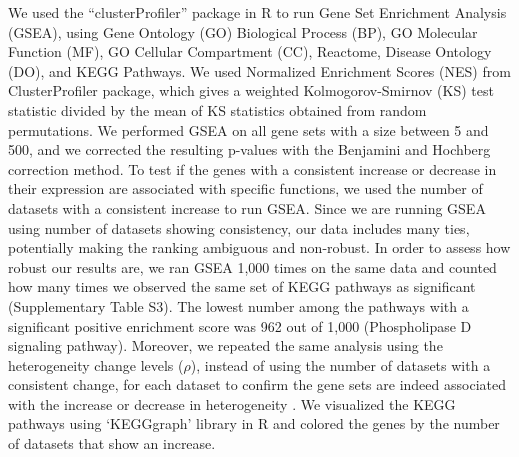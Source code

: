 \documentclass[12pt,twoside]{unicam}
\begin{document}
We used the ``clusterProfiler'' package in R to run Gene Set Enrichment Analysis (GSEA), using Gene Ontology (GO) Biological Process (BP), GO Molecular Function (MF), GO Cellular Compartment (CC), Reactome, Disease Ontology (DO), and KEGG Pathways. We used Normalized Enrichment Scores (NES) from ClusterProfiler package, which gives a weighted Kolmogorov-Smirnov (KS) test statistic divided by the mean of KS statistics obtained from random permutations. We performed GSEA on all gene sets with a size between 5 and 500, and we corrected the resulting p-values with the Benjamini and Hochberg correction method. To test if the genes with a consistent increase or decrease in their expression are associated with specific functions, we used the number of datasets with a consistent increase to run GSEA. Since we are running GSEA using number of datasets showing consistency, our data includes many ties, potentially making the ranking ambiguous and non-robust. In order to assess how robust our results are, we ran GSEA 1,000 times on the same data and counted how many times we observed the same set of KEGG pathways as significant (Supplementary Table S3). The lowest number among the pathways with a significant positive enrichment score was 962 out of 1,000 (Phospholipase D signaling pathway). Moreover, we repeated the same analysis using the heterogeneity change levels (\(\rho\)), instead of using the number of datasets with a consistent change, for each dataset to confirm the gene sets are indeed associated with the increase or decrease in heterogeneity
. We visualized the KEGG pathways using `KEGGgraph' library in R and colored the genes by the number of datasets that show an increase.
\end{document}
